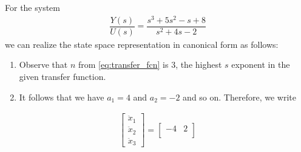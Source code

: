 \begin{example}
	For the system 
	\begin{align}
		\dfrac{Y(s)}{U(s)} = \dfrac{s^3 + 5s^2-s+8}{s^2+4s-2}
	\end{align}
	we can realize the state space representation in canonical form as follows:
	\begin{enumerate}
		\item Observe that $n$ from \eqref{eq:transfer_fcn} is $3$, \ie the highest $s$ exponent in the given transfer function. 
		\item It follows that we have $a_1= 4$ and $a_2 = -2$ and so on. Therefore, we write  
	\end{enumerate}
	\begin{align}
		\begin{bmatrix}
		\ddot{x}_1 \\ \ddot{x}_2 \\ \ddot{x}_3
		\end{bmatrix} = \begin{bmatrix}
		-4 & 2 \\
		\end{bmatrix}
	\end{align}
\end{example}
